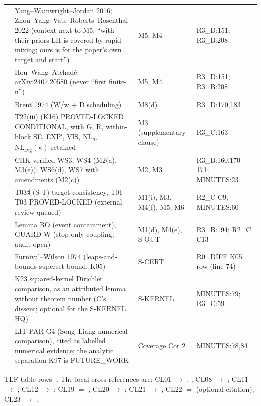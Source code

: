 {\begin{xltabular}{\textwidth}{@{}>{\raggedright\arraybackslash}p{1.0cm} >{\raggedright\arraybackslash}X >{\raggedright\arraybackslash}p{2.6cm} >{\raggedright\arraybackslash}p{2.9cm}@{}}
 & Yang–Wainwright–Jordan 2016; Zhou–Yang–Vats–Roberts–Rosenthal 2022 (context next to M5; ``with their priors LH is covered by rapid mixing; ours is for the paper's own target and start'') & M5, M4 & R3\_D:151; R3\_B:208 \\
 & Hou–Wang–Atchadé arXiv:2407.20580 (never ``first finite-n'') & M5, M4 & R3\_D:151; R3\_B:208 \\
 & Brent 1974 (W/w + D scheduling) & M8(d) & R3\_D:170,183 \\
 & T22(iii) (K16) PROVED-LOCKED CONDITIONAL, with G, R, within-block SE, EXP′, VIS, $\mathrm{NL}_η$, $\mathrm{NL}_{\mathrm{avg}}(κ)$ retained & M3 (supplementary clause) & R3\_C:163 \\
 & CHK-verified WS3, WS4 (M2(a), M3(e)); WS6(d), WS7 with amendments (M2(c)) & M2, M3 & R3\_B:160,170–171; MINUTES:23 \\
 & T03♯ (S-T) target consistency, T01–T03 PROVED-LOCKED (external review queued) & M1(i), M3, M4(f), M5, M6 & R2\_C C9; MINUTES:60 \\
 & Lemma RO (event containment), GUARD-W (stop-only coupling; audit open) & M1(d), M4(e), S-OUT & R3\_B:194; R2\_C C13 \\
 & Furnival–Wilson 1974 (leaps-and-bounds superset bound, K05) & S-CERT & R0\_DIFF K05 row (line 74) \\
 & K23 squared-kernel Dirichlet comparison, as an attributed lemma without theorem number (C's dissent; optional for the S-KERNEL HQ) & S-KERNEL & MINUTES:79; R3\_C:59 \\
 & LIT-PAR G4 (Song–Liang numerical comparison), cited as labelled numerical evidence; the analytic separation K97 is FUTURE\_WORK & Coverage Cor 2 & MINUTES:78,84 \\
\bottomrule
\end{xltabular}
}
TLF table rows: . The local cross-references are: CL01 $\to$ , ; CL08 $\to$ ; CL11 $\to$ ; CL12 $\to$ ; CL19 $=$ ; CL20 $\to$ ; CL21 $\to$ ; CL22 $=$  (optional citation); CL23 $\to$ .
